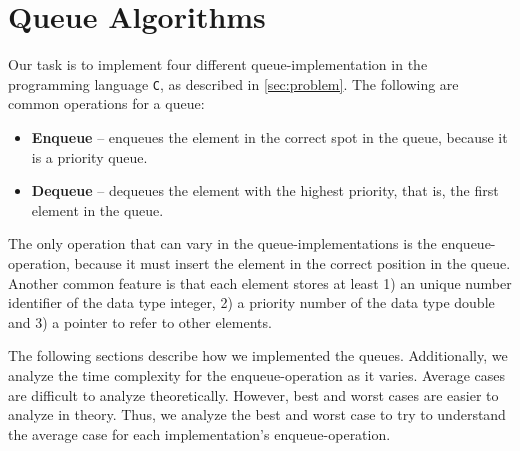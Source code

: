 \documentclass[a4paper,11pt]{kth-mag}
\newcommand*{\skippara}{\par\vspace{\baselineskip} \noindent}
\begin{document}
\section{Queue Algorithms}\label{sec:algorithms}
Our task is to implement four different queue-implementation in the programming language \texttt{C}, as described in \cref{sec:problem}.
The following are common operations for a queue:
\begin{itemize}
    \item \textbf{Enqueue} -- enqueues the element in the correct spot in the queue, because it is a priority queue.
    \item \textbf{Dequeue} -- dequeues the element with the highest priority, that is, the first element in the queue.
\end{itemize}

\skippara The only operation that can vary in the queue-implementations is the enqueue-operation, because it must insert the element in the correct position in the queue.
Another common feature is that each element stores at least 1) an unique number identifier of the data type integer, 2) a priority number of the data type double and 3) a pointer to refer to other elements.

\skippara The following sections describe how we implemented the queues.
Additionally, we analyze the time complexity for the enqueue-operation as it varies.
Average cases are difficult to analyze theoretically.
However, best and worst cases are easier to analyze in theory.
Thus, we analyze the best and worst case to try to understand the average case for each implementation's enqueue-operation.
\end{document}
